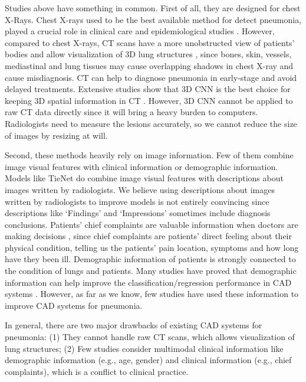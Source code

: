 \documentclass[journal]{IEEEtran}
\begin{document}
Studies above have something in common. First of all, they are designed for chest X-Rays. Chest X-rays used to be the best available method for detect pneumonia, played a crucial role in clinical care and epidemiological studies \cite{Franquet2001Imaging, Thomas2005Standardized}. 
However, compared to chest X-rays, CT scans have a more unobstructed view of patients' bodies and allow visualization of 3D lung structures \cite{korfiatis2009texture}, since bones, skin, vessels, mediastinal and lung tissues may cause overlapping shadows in chest X-ray and cause misdiagnosis. CT can help to diagnose pneumonia in early-stage and avoid delayed treatments.
Extensive studies show that 3D CNN is the best choice for keeping 3D spatial information in CT \cite{Yorozu1987Electron}. However, 3D CNN cannot be applied to raw CT data directly since it will bring a heavy burden to computers. Radiologists need to measure the lesions accurately, so we cannot reduce the size of images by resizing at will.

Second, these methods heavily rely on image information. Few of them combine image visual features with clinical information or demographic information. Models like TieNet do combine image visual features with descriptions about images written by radiologists. We believe using descriptions about images written by radiologists to improve models is not entirely convincing since descriptions like `Findings' and `Impressions' sometimes include diagnosis conclusions. Patients' chief complaints are valuable information when doctors are making decisions \cite{wu2018master}, since chief complaints are patients' direct feeling about their physical condition, telling us the patients' pain location, symptoms and how long have they been ill. 
Demographic information of patients is strongly connected to the condition of lungs and patients. Many studies have proved that demographic information can help improve the classification/regression performance in CAD systems \cite{frisoni2010clinical, coupe2012simultaneous, moradi2015machine, liu2018joint}. However, as far as we know, few studies have used these information to improve CAD systems for pneumonia. 

In general, there are two major drawbacks of existing CAD systems for pneumonia: (1) They cannot handle raw CT scans, which allows visualization of lung structures; (2) Few studies consider multimodal clinical information like demographic information (e.g., age, gender) and clinical information (e.g., chief complaints), which is a conflict to clinical practice.
\end{document}
